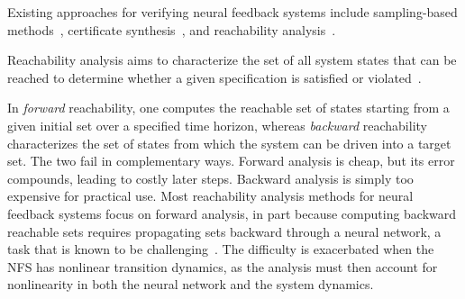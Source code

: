 \documentclass[letterpaper, 10 pt, conference]{ieeeconf}  %
\begin{document}
Existing approaches for verifying neural feedback systems include sampling-based methods~\cite{delecki2025diffusion}, certificate synthesis~\cite{mandal2024formally}, and reachability analysis~\cite{akinwande2025verifying}. 

Reachability analysis aims to characterize the set of all system states that can be reached to determine whether a given specification is satisfied or violated~\cite{althoff2021set}. 

In \emph{forward} reachability, one computes the reachable set of states starting from a given initial set over a specified time horizon, whereas \emph{backward} reachability characterizes the set of states from which the system can be driven into a target set. The two fail in complementary ways. Forward analysis is cheap, but its error compounds, leading to costly later steps. Backward analysis is simply too expensive for practical use.
Most reachability analysis methods for neural feedback systems focus on forward analysis, in part because computing backward reachable sets requires propagating sets backward through a neural network, a task that is known to be challenging~\cite{rober2023backward}. The difficulty is exacerbated when the NFS has nonlinear transition dynamics, as the analysis must then account for nonlinearity in both the neural network and the system dynamics.
\end{document}
